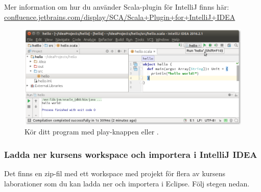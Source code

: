 \noindent Mer information om hur du använder Scala-plugin för IntelliJ finns här:\\
\href{https://confluence.jetbrains.com/display/SCA/Scala+Plugin+for+IntelliJ+IDEA}{confluence.jetbrains.com/display/SCA/Scala+Plugin+for+IntelliJ+IDEA}

\begin{figure}
\centering
\includegraphics[width=1.0\textwidth]{../img/intellij/idea-hello.png} 
\caption{Kör ditt program med play-knappen eller .}
\label{fig:idea:hello-world}
\end{figure}


\subsubsection{Ladda ner kursens workspace och importera i IntelliJ IDEA}

Det finns en zip-fil med ett workspace med projekt för flera av kursens laborationer som du kan ladda ner och importera i Eclipse. Följ stegen nedan.

